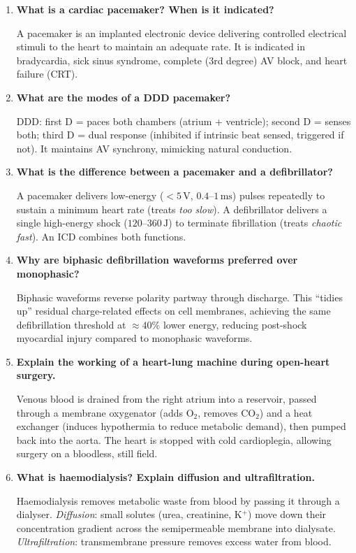 \documentclass[12pt,a4paper]{article}
\newcommand{\Q}[1]{\textbf{#1}\par\noindent\ignorespaces}
\begin{document}
\begin{tcolorbox}[exambox, title={\textbf{Frequently Asked / Viva Questions}}]
\begin{enumerate}[topsep=0pt, label=\textbf{Q\arabic*.}, itemsep=5pt]
  \item \Q{What is a cardiac pacemaker? When is it indicated?}
    A pacemaker is an implanted electronic device delivering controlled electrical stimuli to the heart to maintain an adequate rate. It is indicated in bradycardia, sick sinus syndrome, complete (3rd degree) AV block, and heart failure (CRT).
  \item \Q{What are the modes of a DDD pacemaker?}
    DDD: first D = paces both chambers (atrium + ventricle); second D = senses both; third D = dual response (inhibited if intrinsic beat sensed, triggered if not). It maintains AV synchrony, mimicking natural conduction.
  \item \Q{What is the difference between a pacemaker and a defibrillator?}
    A pacemaker delivers low-energy ($< 5\,\text{V}$, $0.4$--$1\,\text{ms}$) pulses repeatedly to sustain a minimum heart rate (treats \textit{too slow}). A defibrillator delivers a single high-energy shock ($120$--$360\,\text{J}$) to terminate fibrillation (treats \textit{chaotic fast}). An ICD combines both functions.
  \item \Q{Why are biphasic defibrillation waveforms preferred over monophasic?}
    Biphasic waveforms reverse polarity partway through discharge. This ``tidies up'' residual charge-related effects on cell membranes, achieving the same defibrillation threshold at $\approx 40\%$ lower energy, reducing post-shock myocardial injury compared to monophasic waveforms.
  \item \Q{Explain the working of a heart-lung machine during open-heart surgery.}
    Venous blood is drained from the right atrium into a reservoir, passed through a membrane oxygenator (adds O$_2$, removes CO$_2$) and a heat exchanger (induces hypothermia to reduce metabolic demand), then pumped back into the aorta. The heart is stopped with cold cardioplegia, allowing surgery on a bloodless, still field.
  \item \Q{What is haemodialysis? Explain diffusion and ultrafiltration.}
    Haemodialysis removes metabolic waste from blood by passing it through a dialyser. \textit{Diffusion}: small solutes (urea, creatinine, K$^+$) move down their concentration gradient across the semipermeable membrane into dialysate. \textit{Ultrafiltration}: transmembrane pressure removes excess water from blood.

\end{enumerate}
\end{tcolorbox}
\end{document}
